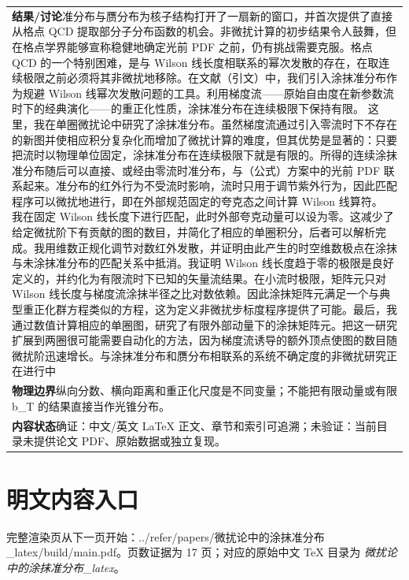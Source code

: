 \documentclass[UTF8,11pt,oneside]{ctexbook}
\begin{document}
\begin{table}[htbp]
\begin{tabular}{@{}p{}@{}}
    \textbf{结果/讨论}\quad 准分布与赝分布为核子结构打开了一扇新的窗口，并首次提供了直接从格点 QCD 提取部分子分布函数的机会。非微扰计算的初步结果令人鼓舞，但在格点学界能够宣称稳健地确定光前 PDF 之前，仍有挑战需要克服。格点 QCD 的一个特别困难，是与 Wilson 线长度相联系的幂次发散的存在，在取连续极限之前必须将其非微扰地移除。在文献（引文）中，我们引入涂抹准分布作为规避 Wilson 线幂次发散问题的工具。利用梯度流——原始自由度在新参数流时下的经典演化——的重正化性质，涂抹准分布在连续极限下保持有限。 这里，我在单圈微扰论中研究了涂抹准分布。虽然梯度流通过引入零流时下不存在的新图并使相应积分复杂化而增加了微扰计算的难度，但其优势是显著的：只要把流时以物理单位固定，涂抹准分布在连续极限下就是有限的。所得的连续涂抹准分布随后可以直接、或经由零流时准分布，与（公式）方案中的光前 PDF 联系起来。准分布的红外行为不受流时影响，流时只用于调节紫外行为，因此匹配程序可以微扰地进行，即在外部规范固定的夸克态之间计算 Wilson 线算符。 我在固定 Wilson 线长度下进行匹配，此时外部夸克动量可以设为零。这减少了给定微扰阶下有贡献的图的数目，并简化了相应的单圈积分，后者可以解析完成。我用维数正规化调节对数红外发散，并证明由此产生的时空维数极点在涂抹与未涂抹准分布的匹配关系中抵消。我证明 Wilson 线长度趋于零的极限是良好定义的，并约化为有限流时下已知的矢量流结果。在小流时极限，矩阵元只对 Wilson 线长度与梯度流涂抹半径之比对数依赖。因此涂抹矩阵元满足一个与典型重正化群方程类似的方程，这为定义非微扰步标度程序提供了可能。最后，我通过数值计算相应的单圈图，研究了有限外部动量下的涂抹矩阵元。把这一研究扩展到两圈很可能需要自动化的方法，因为梯度流诱导的额外顶点使图的数目随微扰阶迅速增长。与涂抹准分布和赝分布相联系的系统不确定度的非微扰研究正在进行中 \\
    \textbf{物理边界}\quad 纵向分数、横向距离和重正化尺度是不同变量；不能把有限动量或有限 b\_T 的结果直接当作光锥分布。 \\
    \textbf{内容状态}\quad 确证：中文/英文 LaTeX 正文、章节和索引可追溯；未验证：当前目录未提供论文 PDF、原始数据或独立复现。 \\
    \bottomrule
  \end{tabular}
\end{table}
\section*{明文内容入口}
\noindent 完整渲染页从下一页开始：../\allowbreak{}refer/\allowbreak{}papers/\allowbreak{}微扰论中的涂抹准分布\_\allowbreak{}latex/\allowbreak{}build/\allowbreak{}main.pdf。页数证据为 17 页；对应的原始中文 TeX 目录为 \emph{微扰论中的涂抹准分布\_latex}。
\clearpage

\clearpage
\end{document}
